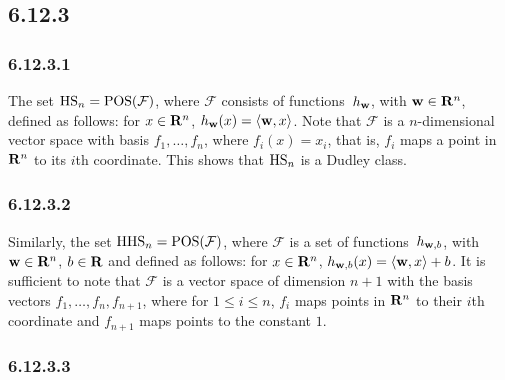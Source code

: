 \subsection*{6.12.3}

\subsubsection*{6.12.3.1}

The set $\operatorname{HS}_n = \operatorname{POS} (\mathcal{F})$, where $\mathcal{F}$ consists of 
functions~$h_{\mathbf{w}}$, with $\mathbf{w} \in \mathbf{R}^n$, defined as 
follows: for $x \in \mathbf{R}^n$, $h_{\mathbf{w}}(x) = \left \langle \mathbf{w}, x \right \rangle$. 
Note that $\mathcal{F}$ is a $n$-dimensional 
vector space with basis $f_1, \ldots, f_n$, where $f_i(x) = x_i$, that is,
$f_i$ maps a point in $\mathbf{R}^n$ to its $i$th coordinate. This shows that 
$\operatorname{HS}_n$ is a Dudley class.

\subsubsection*{6.12.3.2}

Similarly, the set $\operatorname{HHS}_n = \operatorname{POS} ( \mathcal{F})$, where $\mathcal{F}$
is a set of functions~$h_{\mathbf{w}, b}$, with $\mathbf{w} \in \mathbf{R}^n$, $b \in \mathbf{R}$ and 
defined as follows: for $x \in \mathbf{R}^n$, $h_{\mathbf{w}, b}(x) = \left \langle \mathbf{w}, x \right \rangle + b$.
It is sufficient to note that $\mathcal{F}$ is a vector space of dimension $n + 1$
with the basis vectors $f_1, \ldots, f_n, f_{n + 1}$, where for $1 \leq i \leq n$, 
$f_i$ maps points in $\mathbf{R}^n$ to their $i$th coordinate and $f_{n + 1}$ maps points
to the constant $1$.   

\subsubsection*{6.12.3.3}


